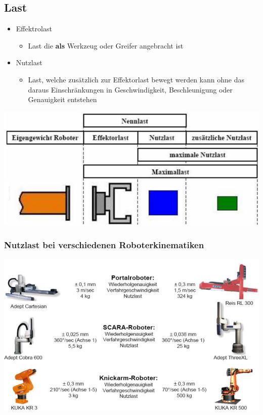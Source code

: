 \begin{minipage}{0.5\linewidth}
    \subsection{Last}
    \begin{itemize}
        \item Effektrolast
        \begin{itemize}
            \item Last die \textbf{als} Werkzeug oder Greifer angebracht ist
        \end{itemize}
        \item Nutzlast
        \begin{itemize}
            \item Last, welche zusätzlich zur Effektorlast bewegt werden kann ohne das daraus Einschränkungen in Geschwindigkeit, Beschleunigung oder Genauigkeit entstehen
        \end{itemize}
    \end{itemize}
\end{minipage}
\begin{minipage}{0.5\linewidth}
    \includegraphics[width=\linewidth]{./bilder/RobLast}
\end{minipage}
\clearpage
\subsubsection{Nutzlast bei verschiedenen Roboterkinematiken}
\includegraphics[width=1\linewidth]{./bilder/RobLastdiffKin}
\enlargethispage{3\baselineskip}
